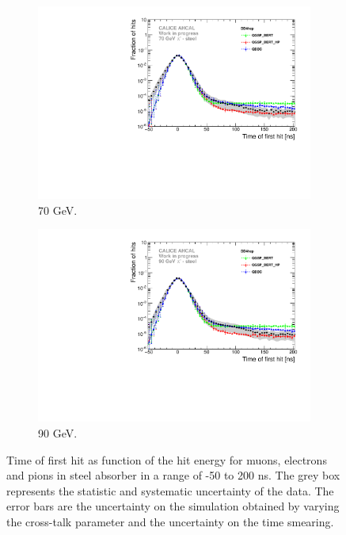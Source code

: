 \begin{figure}[htbp!]
\begin{subfigure}[t]{0.5\textwidth}
    \includegraphics[width=1\textwidth]{../Thesis_Plots/Timing/Pions/Plots/Comparison_SimData_Pion70GeV_LateClusters_DD4hep.pdf}
    \caption{70 GeV.} \label{fig:dNdt_SimData_70GeV_DD4hep}
  \end{subfigure}
  \hfill
  \begin{subfigure}[t]{0.5\textwidth}
    \centering
    \includegraphics[width=1\textwidth]{../Thesis_Plots/Timing/Pions/Plots/Comparison_SimData_Pion90GeV_LateClusters_DD4hep.pdf}
    \caption{90 GeV.} \label{fig:dNdt_SimData_90GeV_DD4hep}
  \end{subfigure}
  \caption{Time of first hit as function of the hit energy for muons, electrons and pions in steel absorber in a range of -50 to 200 ns. The grey box represents the statistic and systematic uncertainty of the data. The error bars are the uncertainty on the \ddhep simulation obtained by varying the cross-talk parameter and the uncertainty on the time smearing.}
\end{figure}



